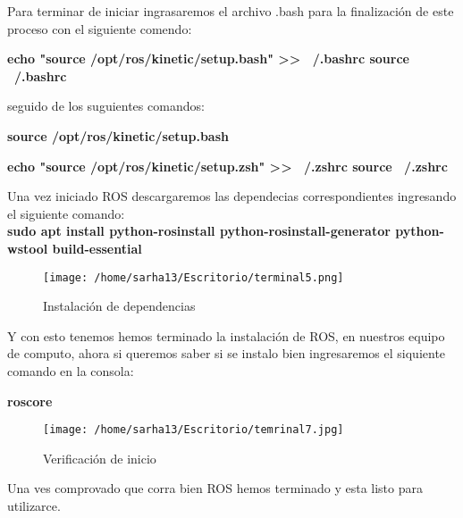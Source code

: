 \documentclass[letter,openrigth,12pt,spanish]{report}
\begin{document}
Para terminar de iniciar ingrasaremos el archivo .bash para la finalizaci\'on de este proceso con el siguiente comendo:\\

\begin{center}
\textbf{echo "source /opt/ros/kinetic/setup.bash" >> ~/.bashrc
source ~/.bashrc}\\
\end{center}

seguido de los suguientes comandos:\\

\begin{center}
\textbf{source /opt/ros/kinetic/setup.bash}\\
\end{center}

\begin{center}
\textbf{echo "source /opt/ros/kinetic/setup.zsh" >> ~/.zshrc
source ~/.zshrc}\\
\end{center}

Una vez iniciado ROS descargaremos las dependecias correspondientes ingresando el siguiente comando:\\

\textbf{sudo apt install python-rosinstall python-rosinstall-generator python-wstool build-essential}\\

\begin{figure}[htp]
\centering
\texttt{[image: /home/sarha13/Escritorio/terminal5.png]}
\caption{Instalaci\'on de dependencias}
\label{Figura 10.}
\end{figure}

Y con esto tenemos hemos terminado la instalaci\'on de ROS, en nuestros equipo de computo, ahora si queremos saber si se instalo bien ingresaremos el siquiente comando en la consola:\\

\begin{center}
\textbf{roscore}
\end{center}

\begin{figure}[htp]
\centering
\texttt{[image: /home/sarha13/Escritorio/temrinal7.jpg]}
\caption{Verificaci\'on de inicio}
\label{Figura 11.}
\end{figure}

Una ves comprovado que corra bien ROS hemos terminado y esta listo para utilizarce.\\
\end{document}

